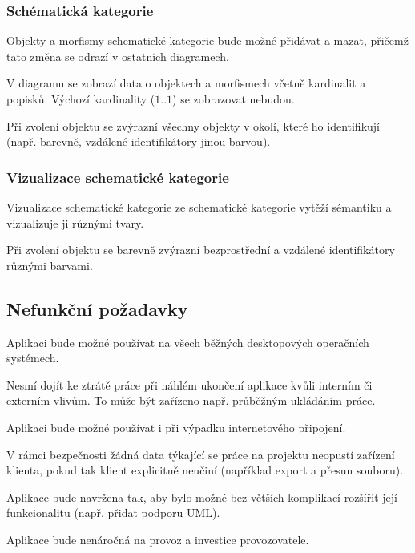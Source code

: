 \subsubsection*{Schématická kategorie}
\begin{enumfp}[resume]
  \item Objekty a morfismy schematické kategorie bude možné přidávat a mazat, přičemž tato změna se odrazí v ostatních diagramech.
  \item V diagramu se zobrazí data o objektech a morfismech včetně kardinalit a popisků.
  Výchozí kardinality ($1..1$) se zobrazovat nebudou.
  \item Při zvolení objektu se zvýrazní všechny objekty v okolí, které ho identifikují (např. barevně, vzdálené identifikátory jinou barvou).
\end{enumfp}

\subsubsection*{Vizualizace schematické kategorie}
\begin{enumfp}[resume]
  \item Vizualizace schematické kategorie ze schematické kategorie vytěží sémantiku a vizualizuje ji různými tvary.
  \item Při zvolení objektu se barevně zvýrazní bezprostřední a vzdálené identifikátory různými barvami.
\end{enumfp}

\subsection{Nefunkční požadavky}

\begin{enumnfp}
  \item Aplikaci bude možné používat na všech běžných desktopových operačních systémech.\label{nfp:can-use-everywhere}
  \item Nesmí dojít ke ztrátě práce při náhlém ukončení aplikace kvůli interním či externím vlivům.
  To může být zařízeno např. průběžným ukládáním práce.
  \item Aplikaci bude možné používat i při výpadku internetového připojení.
  \item V rámci bezpečnosti žádná data týkající se práce na projektu neopustí zařízení klienta, pokud tak klient explicitně neučiní (například export a přesun souboru).\label{nfp:safety}
  \item Aplikace bude navržena tak, aby bylo možné bez větších komplikací rozšířit její funkcionalitu (např. přidat podporu UML).
  \item Aplikace bude nenáročná na provoz a investice provozovatele.\label{nfp:nenarocnost}
\end{enumnfp}

